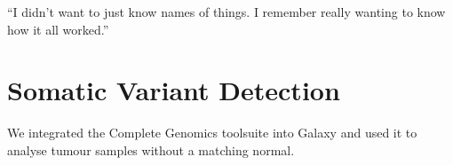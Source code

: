 \begin{savequote}[75mm]
“I didn’t want to just know names of things. I remember really wanting to know how it all worked.”
\end{savequote}

\chapter{Somatic Variant Detection}
\label{chapter:virtualnormal}
\setcounter{figure}{-1}
\setcounter{table}{-1}
\setcounter{section}{-1}

We integrated the Complete Genomics toolsuite into Galaxy and used it to analyse tumour samples without a matching normal.

